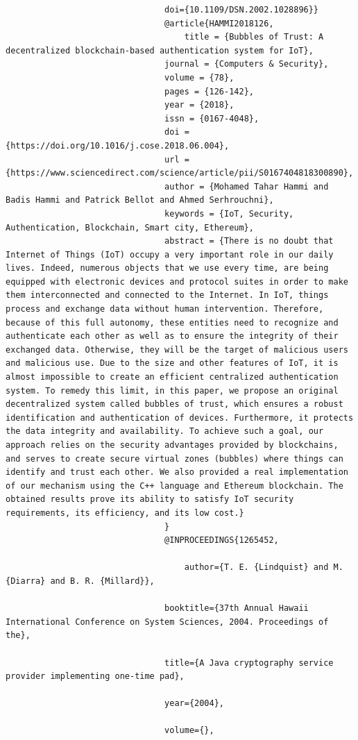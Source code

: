 \documentclass[a4paper,12pt]{scrartcl}
\begin{document}
\begin{verbatim}
								doi={10.1109/DSN.2002.1028896}}
								@article{HAMMI2018126,
									title = {Bubbles of Trust: A decentralized blockchain-based authentication system for IoT},
								journal = {Computers & Security},
								volume = {78},
								pages = {126-142},
								year = {2018},
								issn = {0167-4048},
								doi = {https://doi.org/10.1016/j.cose.2018.06.004},
								url = {https://www.sciencedirect.com/science/article/pii/S0167404818300890},
								author = {Mohamed Tahar Hammi and Badis Hammi and Patrick Bellot and Ahmed Serhrouchni},
								keywords = {IoT, Security, Authentication, Blockchain, Smart city, Ethereum},
								abstract = {There is no doubt that Internet of Things (IoT) occupy a very important role in our daily lives. Indeed, numerous objects that we use every time, are being equipped with electronic devices and protocol suites in order to make them interconnected and connected to the Internet. In IoT, things process and exchange data without human intervention. Therefore, because of this full autonomy, these entities need to recognize and authenticate each other as well as to ensure the integrity of their exchanged data. Otherwise, they will be the target of malicious users and malicious use. Due to the size and other features of IoT, it is almost impossible to create an efficient centralized authentication system. To remedy this limit, in this paper, we propose an original decentralized system called bubbles of trust, which ensures a robust identification and authentication of devices. Furthermore, it protects the data integrity and availability. To achieve such a goal, our approach relies on the security advantages provided by blockchains, and serves to create secure virtual zones (bubbles) where things can identify and trust each other. We also provided a real implementation of our mechanism using the C++ language and Ethereum blockchain. The obtained results prove its ability to satisfy IoT security requirements, its efficiency, and its low cost.}
								}
								@INPROCEEDINGS{1265452,
									
									author={T. E. {Lindquist} and M. {Diarra} and B. R. {Millard}},
								
								booktitle={37th Annual Hawaii International Conference on System Sciences, 2004. Proceedings of the}, 
								
								title={A Java cryptography service provider implementing one-time pad}, 
								
								year={2004},
								
								volume={},
								

\end{verbatim}
\end{document}
